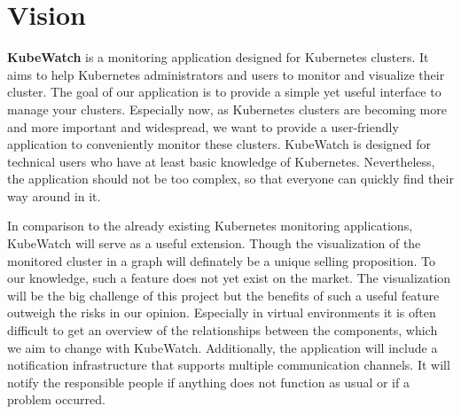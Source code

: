 \chapter{Vision}


\textbf{KubeWatch} is a monitoring application designed for Kubernetes clusters.
It aims to help Kubernetes administrators and users to monitor and visualize their cluster.
The goal of our application is to provide a simple yet useful interface to manage your clusters.
Especially now, as Kubernetes clusters are becoming more and more important and widespread,
we want to provide a user-friendly application to conveniently monitor these clusters.
KubeWatch is designed for technical users who have at least basic knowledge of Kubernetes.
Nevertheless, the application should not be too complex, so that everyone can quickly find their way around in it.

\noindent
In comparison to the already existing Kubernetes monitoring applications, KubeWatch will serve as a useful extension.
Though the visualization of the monitored cluster in a graph will definately be a unique selling proposition.
To our knowledge, such a feature does not yet exist on the market.
The visualization will be the big challenge of this project but the benefits of such a useful feature outweigh the risks in our opinion.
Especially in virtual environments it is often difficult to get an overview of the relationships between the components,
which we aim to change with KubeWatch.
Additionally, the application will include a notification infrastructure that supports multiple communication channels.
It will notify the responsible people if anything does not function as usual or if a problem occurred.
